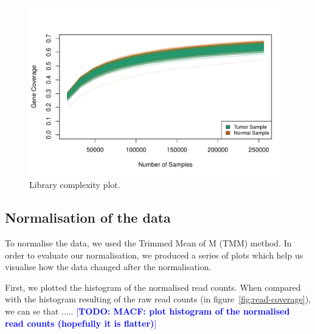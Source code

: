 \documentclass[10pt,twocolumn]{article}\usepackage[]{graphicx}\usepackage[]{color}
\makeatletter
\def\maxwidth{ %
  \ifdim\Gin@nat@width>\linewidth
    \linewidth
  \else
    \Gin@nat@width
  \fi
}
\newenvironment{knitrout}{}{} %
\newcommand{\todo}[1]{\textcolor{blue}{[\textbf{TODO: #1}]} }
\makeatother
\begin{document}
\begin{knitrout}
\color{fgcolor}\begin{figure}[ht]

{\centering \includegraphics[width=\maxwidth]{figure/library-complexity-1} 

}

\caption[Library complexity plot]{Library complexity plot.}\label{fig:library-complexity}
\end{figure}


\end{knitrout}

\subsection{Normalisation of the data}
To normalise the data, we used the Trimmed Mean of M (TMM) method. In order to evaluate our normalisation, we produced a series of plots which help us visualise how the data changed after the normalisation.

First, we plotted the histogram of the normalised read counts. When compared with the histogram resulting of the raw read counts (in figure~\ref{fig:read-coverage}), we can se that .....
\todo{MACF: plot histogram of the normalised read counts (hopefully it is flatter)}
\end{document}
